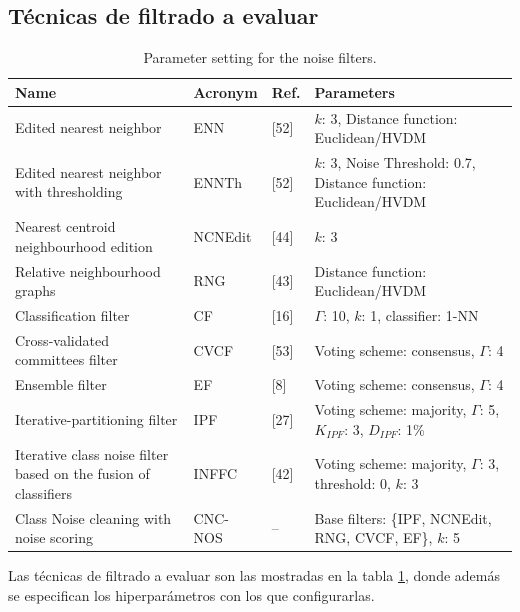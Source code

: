 \documentclass[print, color]{ugrTFG}
\begin{document}
 \subsection{Técnicas de filtrado a evaluar}
    \begin{table}[t!]
        \centering
        \footnotesize
        \caption{Parameter setting for the noise filters.}
        \label{tab:noise-filters}
        \begin{tabularx}{\textwidth}{@{}p{}p{}p{}X@{}}
        \toprule
        Name & Acronym & Ref. & Parameters \\
        \midrule
        Edited nearest neighbor & ENN & [52] & $k$: 3, Distance function: Euclidean/HVDM \\
        Edited nearest neighbor with thresholding & ENNTh & [52] & $k$: 3, Noise Threshold: 0.7, Distance function: Euclidean/HVDM \\
        Nearest centroid neighbourhood edition & NCNEdit & [44] & $k$: 3 \\
        Relative neighbourhood graphs & RNG & [43] & Distance function: Euclidean/HVDM \\
        Classification filter & CF & [16] & $\Gamma$: 10, $k$: 1, classifier: 1-NN \\
        Cross-validated committees filter & CVCF & [53] & Voting scheme: consensus, $\Gamma$: 4 \\
        Ensemble filter & EF & [8] & Voting scheme: consensus, $\Gamma$: 4 \\
        Iterative-partitioning filter & IPF & [27] & Voting scheme: majority, $\Gamma$: 5, $K_{IPF}$: 3, $D_{IPF}$: 1\% \\
        Iterative class noise filter based on the fusion of classifiers & INFFC & [42] & Voting scheme: majority, $\Gamma$: 3, threshold: 0, $k$: 3 \\
        Class Noise cleaning with noise scoring & CNC-NOS & -- & Base filters: \{IPF, NCNEdit, RNG, CVCF, EF\}, $k$: 5 \\
        \bottomrule
        \end{tabularx}
    \end{table}
 Las técnicas de filtrado a evaluar son las mostradas en la tabla \ref{tab:noise-filters}, donde además se especifican los hiperparámetros con los que configurarlas.
\end{document}
